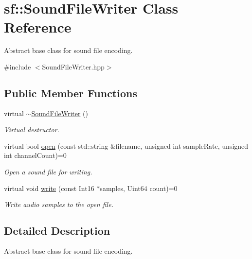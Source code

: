\hypertarget{classsf_1_1_sound_file_writer}{}\section{sf\+:\+:Sound\+File\+Writer Class Reference}
\label{classsf_1_1_sound_file_writer}


Abstract base class for sound file encoding.  




{\ttfamily \#include $<$Sound\+File\+Writer.\+hpp$>$}

\subsection*{Public Member Functions}
\begin{DoxyCompactItemize}
\item 
virtual \mbox{\hyperlink{classsf_1_1_sound_file_writer_a76944fc158688f35050bd5b592c90270}{$\sim$\+Sound\+File\+Writer}} ()
\begin{DoxyCompactList}\small\item\em Virtual destructor. \end{DoxyCompactList}\item 
virtual bool \mbox{\hyperlink{classsf_1_1_sound_file_writer_a5c92bcaaa880ef4d3eaab18dae1d3d07}{open}} (const std\+::string \&filename, unsigned int sample\+Rate, unsigned int channel\+Count)=0
\begin{DoxyCompactList}\small\item\em Open a sound file for writing. \end{DoxyCompactList}\item 
virtual void \mbox{\hyperlink{classsf_1_1_sound_file_writer_a4ce597e7682d22c5b2c98d77e931a1da}{write}} (const Int16 $\ast$samples, Uint64 count)=0
\begin{DoxyCompactList}\small\item\em Write audio samples to the open file. \end{DoxyCompactList}\end{DoxyCompactItemize}


\subsection{Detailed Description}
Abstract base class for sound file encoding. 

\begin{DoxyVerb}\end{DoxyVerb}


